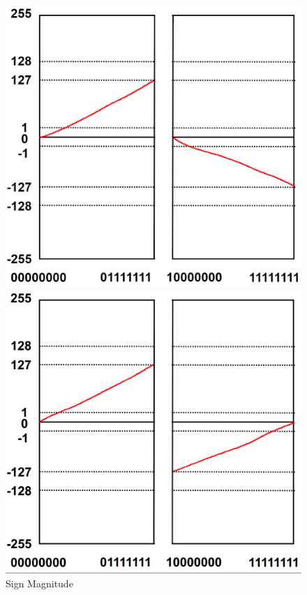\documentclass[addpoints, 12pt, answers]{exam}
\begin{document}
\begin{questions}
\begin{parts}
\begin{figure}[h]
\begin{minipage}[t]{0.35\textwidth}
                \includegraphics[width=\linewidth]{assets/number_sign.png}
                \caption*{Sign Magnitude}
            \end{minipage}
            \hfill
            \begin{minipage}[t]{0.35\textwidth}
                \includegraphics[width=\linewidth]{assets/number_one.png}

\end{minipage}
\end{figure}
\end{parts}
\end{questions}
\end{document}
